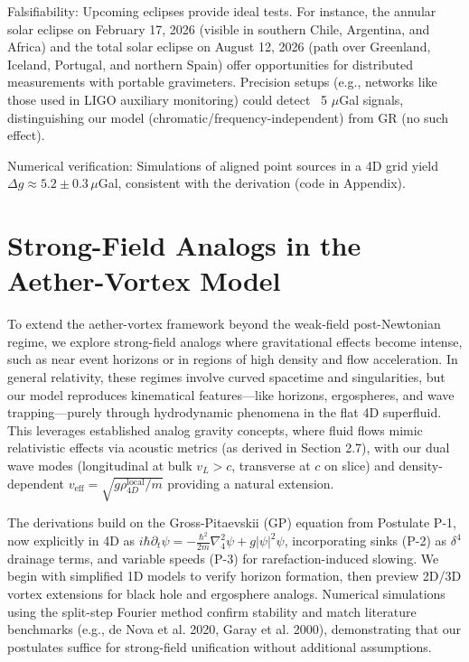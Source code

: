 \documentclass{article}
\begin{document}
Falsifiability: Upcoming eclipses provide ideal tests. For instance, the annular solar eclipse on February 17, 2026 (visible in southern Chile, Argentina, and Africa) and the total solar eclipse on August 12, 2026 (path over Greenland, Iceland, Portugal, and northern Spain) offer opportunities for distributed measurements with portable gravimeters. Precision setups (e.g., networks like those used in LIGO auxiliary monitoring) could detect ~5 $\mu$Gal signals, distinguishing our model (chromatic/frequency-independent) from GR (no such effect).

Numerical verification: Simulations of aligned point sources in a 4D grid yield $\Delta g \approx 5.2 \pm 0.3 \, \mu$Gal, consistent with the derivation (code in Appendix).

\section{Strong-Field Analogs in the Aether-Vortex Model}

To extend the aether-vortex framework beyond the weak-field post-Newtonian regime, we explore strong-field analogs where gravitational effects become intense, such as near event horizons or in regions of high density and flow acceleration. In general relativity, these regimes involve curved spacetime and singularities, but our model reproduces kinematical features---like horizons, ergospheres, and wave trapping---purely through hydrodynamic phenomena in the flat 4D superfluid. This leverages established analog gravity concepts, where fluid flows mimic relativistic effects via acoustic metrics (as derived in Section 2.7), with our dual wave modes (longitudinal at bulk $v_L > c$, transverse at $c$ on slice) and density-dependent $v_{\text{eff}} = \sqrt{g \rho_{4D}^{\text{local}} / m}$ providing a natural extension.

The derivations build on the Gross-Pitaevskii (GP) equation from Postulate P-1, now explicitly in 4D as $i \hbar \partial_t \psi = -\frac{\hbar^2}{2 m} \nabla_4^2 \psi + g |\psi|^2 \psi$, incorporating sinks (P-2) as $\delta^4$ drainage terms, and variable speeds (P-3) for rarefaction-induced slowing. We begin with simplified 1D models to verify horizon formation, then preview 2D/3D vortex extensions for black hole and ergosphere analogs. Numerical simulations using the split-step Fourier method confirm stability and match literature benchmarks (e.g., de Nova et al. 2020, Garay et al. 2000), demonstrating that our postulates suffice for strong-field unification without additional assumptions.
\end{document}
